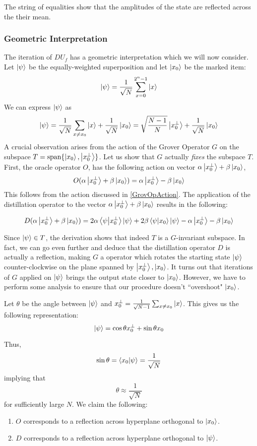 The string of equalities show that the amplitudes of the state are reflected across the their mean.

\subsubsection{Geometric Interpretation}

The iteration of $DU_f$ has a geometric interpretation which we will now consider. Let $\ket{\psi}$ be the equally-weighted superposition and let $\ket{x_0}$ be the marked item:
$$ \ket{\psi} = \frac{1}{\sqrt{N}} \sum_{x=0}^{2^n-1} \ket{x} $$
%
We can express $\ket{\psi}$ as
$$ \ket{\psi} = \frac{1}{\sqrt{N}}\sum_{x \neq x_0} \ket{x} + \frac{1}{\sqrt{N}}\ket{x_0} = \sqrt{\frac{N-1}{N}}\ket{x_0^{\perp}} + \frac{1}{\sqrt{N}}\ket{x_0}$$
%
A crucial observation arises from the action of the Grover Operator $G$ on the subspace $T = \text{span}\{\ket{x_0}, \ket{x_0^{\perp}}\}$. Let us show that $G$ actually \emph{fixes} the subspace $T$. First,
the oracle operator $O$, has the following action on vector $ \alpha \ket{x_0^{\perp}} + \beta \ket{x_0}$,
\[ O(\alpha \ket{x_0^{\perp}} + \beta \ket{x_0}) = \alpha \ket{x_0^{\perp}} - \beta \ket{x_0}\]
This follows from the action discussed in \ref{GrovOpAction}. The application of the distillation operator to the vector $\alpha \ket{x_0^{\perp}} + \beta \ket{x_0}$ results in the following:

\[D(\alpha \ket{x_0^{\perp}} + \beta \ket{x_0}) = 2 \alpha \bra{\psi}\ket{x_0^{\perp}}\ket{\psi} + 2 \beta \bra{\psi}\ket{x_0}\ket{\psi}  - \alpha\ket{x_0^{\perp}} - \beta\ket{x_0} \]

Since $\ket{\psi} \in T$, the derivation shows that indeed $T$ is a $G$-invariant subspace. In fact, we can go even further and deduce that the distillation operator $D$ is actually a reflection, making $G$ a operator which rotates the starting state $\ket{\psi}$ counter-clockwise on the plane spanned by $\ket{x_0^{\perp}},\ket{x_0}$. It turns out that iterations of $G$ applied on $\ket{\psi}$ brings the output state closer to $\ket{x_0}$. However, we have to perform some analysis to ensure that our procedure doesn't ``overshoot" $\ket{x_0}$.

Let $\theta$ be the angle between $\ket{\psi}$ and $x_0^{\perp} = \frac{1}{\sqrt{N-1}}\sum_{x\neq x_0} \ket{x}$. This gives us the following representation:
$$ \ket{\psi} =  \cos{\theta}{x_0^{\perp}} + \sin{\theta}x_0 $$

Thus,
$$\sin{\theta} = \bra{x_0}\ket{\psi} = \frac{1}{\sqrt{N}}$$
implying that
$$ \theta \approx \frac{1}{\sqrt{N}} $$ for sufficiently large $N$.
We claim the following:
\begin{enumerate}
  \item $O$ corresponds to a reflection across hyperplane orthogonal to $\ket{x_0}$.
  \item $D$ corresponds to a reflection across hyperplane orthogonal to $\ket{\psi}$.
\end{enumerate}

